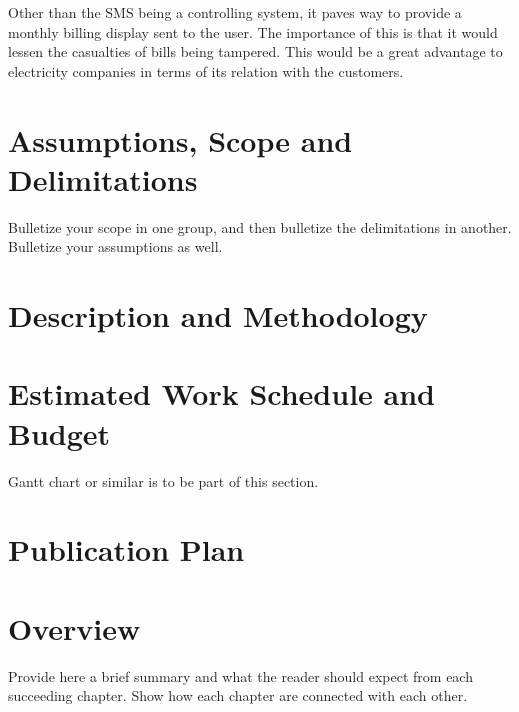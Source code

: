 	Other than the SMS being a controlling system, it paves way to provide a monthly billing display sent to the user. The importance of this is that it would lessen the casualties of bills being tampered. This would be a great advantage to electricity companies in terms of its relation with the customers.




\section{Assumptions, Scope and Delimitations}

Bulletize your scope in one group, and then bulletize the delimitations in another.  Bulletize your assumptions as well.


\section{Description and Methodology}

\blindtext


\ifFinished
\else

\section{Estimated Work Schedule and Budget}

Gantt chart or similar is to be part of this section.

\blindtext

\section{Publication Plan}
\blindtext

\fi


\section{Overview}

Provide here a brief summary and what the reader should expect from each succeeding chapter.  Show how each chapter are connected with each other.

